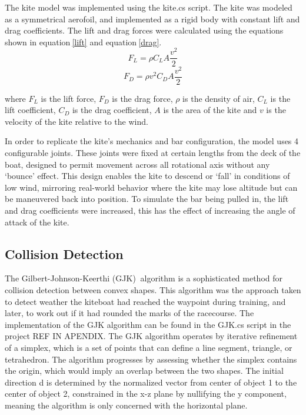 The kite model was implemented using the kite.cs script. The kite was modeled as a symmetrical aerofoil, and implemented as a rigid body with constant lift and drag coefficients. The lift and drag forces were calculated using the equations shown in equation$~$\ref{lift} and equation$~$\ref{drag}.
\begin{equation}
    F_L = \rho C_L A \frac{v^2}{2} 
    \label{lift}
\end{equation}
\begin{equation}
    F_D = \rho v^2 C_D A \frac{v^2}{2} 
    \label{drag}
\end{equation}

where $F_L$ is the lift force, $F_D$ is the drag force, $\rho$ is the density of air, $C_L$ is the lift coefficient, $C_D$ is the drag coefficient, $A$ is the area of the kite and $v$ is the velocity of the kite relative to the wind.

In order to replicate the kite's mechanics and bar configuration, the model uses 4 configurable joints. These joints were fixed at certain lengths from the deck of the boat, designed to permit movement across all rotational axis without any `bounce' effect. This design enables the kite to descend or `fall' in conditions of low wind, mirroring real-world behavior where the kite may lose altitude but can be maneuvered back into position. To simulate the bar being pulled in, the lift and drag coefficients were increased, this has the effect of increasing the angle of attack of the kite.


\subsection{Collision Detection}
The Gilbert-Johnson-Keerthi (GJK)$~$\cite{gilbert88gjk} algorithm is a sophisticated method for collision detection between convex shapes. This algorithm was the approach taken to detect weather the kiteboat had reached the waypoint during training, and later, to work out if it had rounded the marks of the racecourse. The implementation of the GJK algorithm can be found in the GJK.cs script in the project REF IN APENDIX.
The GJK algorithm operates by iterative refinement of a simplex, which is a set of points that can define a line segment, triangle, or tetrahedron. The algorithm progresses by assessing whether the simplex contains the origin, which would imply an overlap between the two shapes. The initial direction d is determined by the normalized vector from center of object 1 to the center of object 2, constrained in the x-z plane by nullifying the y component, meaning the algorithm is only concerned with the horizontal plane.  


